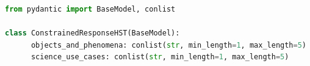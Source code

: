 \documentclass[10pt]{article} %
\begin{document}
\begin{lstlisting}[language=Python]
from pydantic import BaseModel, conlist

class ConstrainedResponseHST(BaseModel):
      objects_and_phenomena: conlist(str, min_length=1, max_length=5)
      science_use_cases: conlist(str, min_length=1, max_length=5)
\end{lstlisting}







\end{document}
